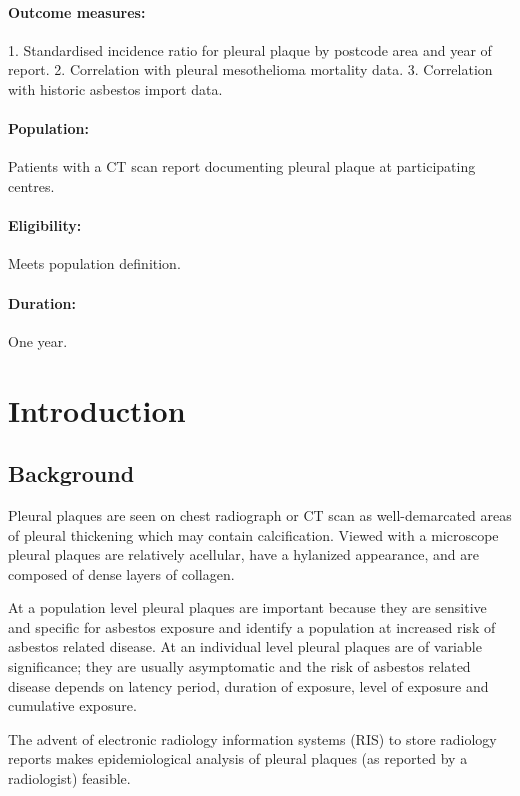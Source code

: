 \documentclass[a4paper,10pt]{article}
\begin{document}
\paragraph{Outcome measures:} 1. Standardised incidence ratio for pleural plaque by postcode area and year of report. 2. Correlation with pleural mesothelioma mortality data. 3. Correlation with historic asbestos import data.
\paragraph{Population:} Patients with a CT scan report documenting pleural plaque at participating centres.
\paragraph{Eligibility:} Meets population definition.
\paragraph{Duration:} One year.


\newpage


\section{Introduction}
\subsection{Background}

Pleural plaques are seen on chest radiograph or CT scan as well-demarcated areas of pleural thickening which may contain calcification. Viewed with a microscope pleural plaques are relatively acellular, have a hylanized appearance, and are composed of dense layers of collagen.\cite{Hansell2008}

At a population level pleural plaques are important because they are sensitive and specific for asbestos exposure and identify a population at increased risk of asbestos related disease. \cite{Hillerdal1980, Paris2009} At an individual level pleural plaques are of variable significance; they are usually asymptomatic and the risk of asbestos related disease depends on latency period, duration of exposure, level of exposure and cumulative exposure. \cite{Mastrangelo2009, Larson2012}

The advent of electronic radiology information systems (RIS) to store radiology reports makes epidemiological analysis of pleural plaques (as reported by a radiologist) feasible. 
\end{document}
